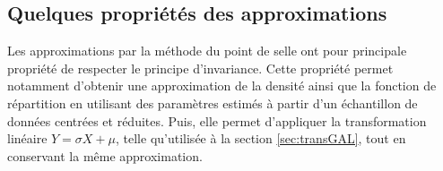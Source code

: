 



\subsection{Quelques propriétés des approximations}
\label{sec:proprietesaddle}

Les approximations par la méthode du point de selle ont pour
principale propriété de respecter le principe d'invariance. Cette
propriété permet notamment d'obtenir une approximation de la densité
ainsi que la fonction de répartition en utilisant des paramètres
estimés à partir d'un échantillon de données centrées et
réduites. Puis, elle permet d'appliquer la transformation
linéaire $Y = \sigma{X}+\mu$, telle qu'utilisée à la section
\ref{sec:transGAL}, tout en conservant la même approximation.

